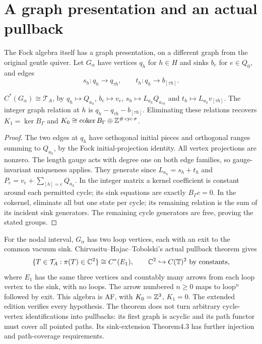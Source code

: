 \section{A graph presentation and an actual pullback}
The Fock algebra itself has a graph presentation, on a different graph from the original gentle quiver. Let $G_\alpha$ have vertices $q_h$ for $h\in H$ and sinks $b_e$ for $e\in Q_0$, and edges
\[
 s_h:q_h\to q_{\tau h},\qquad t_h:q_h\to b_{[\tau h]}.
\]
\begin{proposition}\label{thm:graphmodel}
$C^*(G_\alpha)\cong\mathcal T_A$, by $q_h\mapsto Q_{a_h}$, $b_e\mapsto v_e$, $s_h\mapsto L_{a_h}Q_{a_{\tau h}}$ and $t_h\mapsto L_{a_h}v_{[\tau h]}$. The integer graph relation at $h$ is $q_h-q_{\tau h}-b_{[\tau h]}$. Eliminating these relations recovers $K_1=\ker B_\Gamma$ and $K_0\cong\operatorname{coker}B_\Gamma\oplus\mathbb Z^{\#\operatorname{cyc}\sigma}$.
\end{proposition}
\begin{proof}
The two edges at $q_h$ have orthogonal initial pieces and orthogonal ranges summing to $Q_{a_h}$, by the Fock initial-projection identity. All vertex projections are nonzero. The length gauge acts with degree one on both edge families, so gauge-invariant uniqueness applies. They generate since $L_{a_h}=s_h+t_h$ and $P_e=v_e+\sum_{[h]=e}Q_{a_h}$. In the integer matrix a kernel coefficient is constant around each permitted cycle; its sink equations are exactly $B_\Gamma c=0$. In the cokernel, eliminate all but one state per cycle; its remaining relation is the sum of its incident sink generators. The remaining cycle generators are free, proving the stated groups.
\end{proof}
For the nodal interval, $G_\alpha$ has two loop vertices, each with an exit to the common vacuum sink. Chirvasitu--Hajac--Tobolski's actual pullback theorem \cite[Theorem3.4]{GraphPullbacks} gives
\[
 \{T\in\mathcal T_A:\pi(T)\in\mathbb C^2\}
 \cong C^*(E_1),\qquad \mathbb C^2\hookrightarrow C(\mathbb T)^2\text{ by constants},
\]
where $E_1$ has the same three vertices and countably many arrows from each loop vertex to the sink, with no loops. The arrow numbered $n\ge0$ maps to loop$^n$ followed by exit. This algebra is AF, with $K_0=\mathbb Z^3$, $K_1=0$. The extended edition verifies every hypothesis. The theorem does not turn arbitrary cycle-vertex identifications into pullbacks: its first graph is acyclic and its path functor must cover all pointed paths. Its sink-extension Theorem4.3 has further injection and path-coverage requirements.

